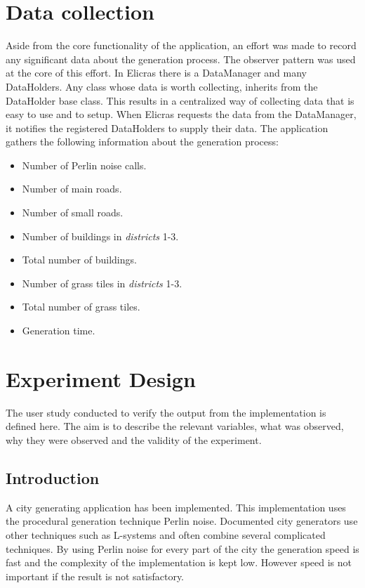 \section{Data collection}
	Aside from the core functionality of the application, an effort was made to record any significant data about the generation process. The observer pattern was used at the core of this effort. In Elicras there is a DataManager and many DataHolders. Any class whose data is worth collecting, inherits from the DataHolder base class. This results in a centralized way of collecting data that is easy to use and to setup. When Elicras requests the data from the DataManager, it notifies the registered DataHolders to supply their data. The application gathers the following information about the generation process:
	\begin{itemize}
		\item Number of Perlin noise calls.
		\item Number of main roads.
		\item Number of small roads.
		\item Number of buildings in \textit{districts} 1-3.
		\item Total number of buildings.
		\item Number of grass tiles in \textit{districts} 1-3.
		\item Total number of grass tiles.
		\item Generation time.
	\end{itemize}
	
	
\section{Experiment Design}
	The user study conducted to verify the output from the implementation is defined here. The aim is to describe the relevant variables, what was observed, why they were observed and the validity of the experiment.
	\subsection{Introduction}
	A city generating application has been implemented. This implementation uses the procedural generation technique Perlin noise. Documented city generators use other techniques such as L-systems and often combine several complicated techniques\cite{ProceduralModeling6}. By using Perlin noise for every part of the city the generation speed is fast and the complexity of the implementation is kept low. However speed is not important if the result is not satisfactory.
		
